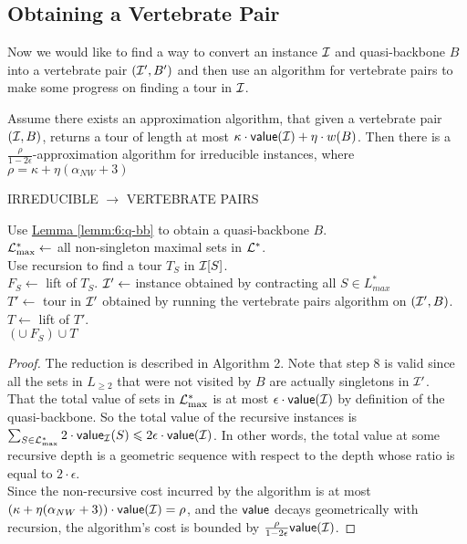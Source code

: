 \documentclass[./main.tex]{subfiles}
\begin{document}
	\subsection{Obtaining a Vertebrate Pair}
	Now we would like to find a way to convert an instance $\mathcal{I}$ and quasi-backbone $B$ into a vertebrate pair $(\mathcal{I}', B')$ and then use an algorithm for vertebrate pairs to make some progress on finding a tour in $\mathcal{I}$.\\
	\begin{theorem}
		Assume there exists an approximation algorithm, that given a vertebrate pair $(\mathcal{I}, B)$, returns a tour of length at most $\kappa\cdot\textsf{\textup{value}}(\mathcal{I}) + \eta\cdot w(B)$. Then there is a $\frac{\rho}{1 - 2\epsilon}$-approximation algorithm for irreducible instances, where $\rho = \kappa + \eta(\alpha_{NW} + 3)$
	\end{theorem}
	\begin{algorithm}\label{alg:6:irr-atsp}
		\caption{IRREDUCIBLE $\rightarrow$ VERTEBRATE PAIRS}
		Use \hyperref[lemm:6:q-bb]{Lemma \ref{lemm:6:q-bb}} to obtain a quasi-backbone $B$.\\
		$\mathcal{L}^*_{\max} \leftarrow $ all non-singleton maximal sets in $\mathcal{L}^*$.\\
		 {
		Use recursion to find a tour $T_S$ in $\mathcal{I}[S]$.\\
		$F_S\leftarrow$ lift of $T_S$.
		}
		$\mathcal{I}'\leftarrow$ instance obtained by contracting all $S\in L_{max}^*$\\
		$T'\leftarrow$ tour in $\mathcal{I}'$ obtained by running the vertebrate pairs algorithm on $(\mathcal{I}', B)$.\\
		$T \leftarrow $ lift of $T'$.\\
		\Return  $\left(\cup\ F_S\right)\cup T$
	\end{algorithm}

	\begin{proof}
		The reduction is described in Algorithm 2. Note that step 8 is valid since all the sets in $L_{\geq 2}$ that were not visited by $B$ are actually singletons in $\mathcal{I}'$.\vspace{2mm}
		\\That the total value of sets in $\mathcal{L}^*_{\max}$ is at most $\epsilon\cdot \textsf{\textup{value}}(\mathcal{I})$ by definition of the quasi-backbone. So the total value of the recursive instances is $\sum_{S\in \mathcal{L}^*_{\max}}2\cdot\textsf{\textup{value}}_{\mathcal{I}}(S)\leqslant 2\epsilon\cdot\textsf{\textup{value}}(\mathcal{I})$. In other words, the total value at some recursive depth is a geometric sequence with respect to the depth whose ratio is equal to $2\cdot\epsilon$.\vspace{2mm}
		\\Since the non-recursive cost incurred by the algorithm is at most $(\kappa + \eta (\alpha_{NW} + 3))\cdot\textsf{\textup{value}}(\mathcal{I}) = \rho$, and the $\textsf{\textup{value}}$ decays geometrically with recursion, the algorithm's cost is bounded by $\frac{\rho}{1-2\epsilon}\textsf{\textup{value}}(\mathcal{I})$.

	\end{proof}
\end{document}
